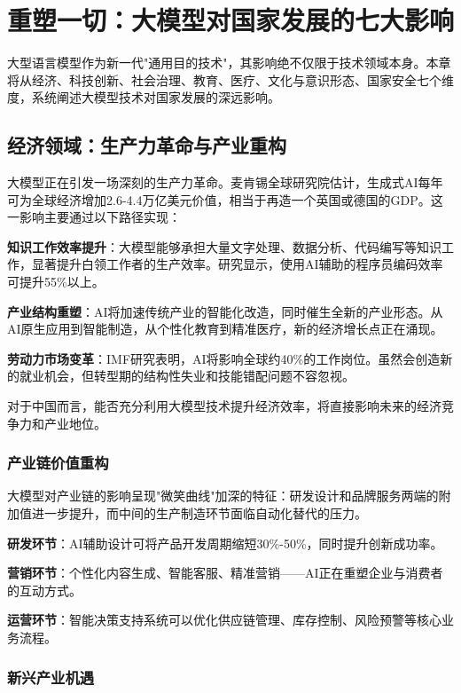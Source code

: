 \chapter{重塑一切：大模型对国家发展的七大影响}

大型语言模型作为新一代"通用目的技术"，其影响绝不仅限于技术领域本身。本章将从经济、科技创新、社会治理、教育、医疗、文化与意识形态、国家安全七个维度，系统阐述大模型技术对国家发展的深远影响。

\section{经济领域：生产力革命与产业重构}

大模型正在引发一场深刻的生产力革命。麦肯锡全球研究院估计，生成式AI每年可为全球经济增加2.6-4.4万亿美元价值，相当于再造一个英国或德国的GDP。这一影响主要通过以下路径实现：

\textbf{知识工作效率提升}：大模型能够承担大量文字处理、数据分析、代码编写等知识工作，显著提升白领工作者的生产效率。研究显示，使用AI辅助的程序员编码效率可提升55\%以上。

\textbf{产业结构重塑}：AI将加速传统产业的智能化改造，同时催生全新的产业形态。从AI原生应用到智能制造，从个性化教育到精准医疗，新的经济增长点正在涌现。

\textbf{劳动力市场变革}：IMF研究表明，AI将影响全球约40\%的工作岗位。虽然会创造新的就业机会，但转型期的结构性失业和技能错配问题不容忽视。

对于中国而言，能否充分利用大模型技术提升经济效率，将直接影响未来的经济竞争力和产业地位。

\subsection{产业链价值重构}

大模型对产业链的影响呈现"微笑曲线"加深的特征：研发设计和品牌服务两端的附加值进一步提升，而中间的生产制造环节面临自动化替代的压力。

\textbf{研发环节}：AI辅助设计可将产品开发周期缩短30\%-50\%，同时提升创新成功率。

\textbf{营销环节}：个性化内容生成、智能客服、精准营销——AI正在重塑企业与消费者的互动方式。

\textbf{运营环节}：智能决策支持系统可以优化供应链管理、库存控制、风险预警等核心业务流程。

\subsection{新兴产业机遇}

